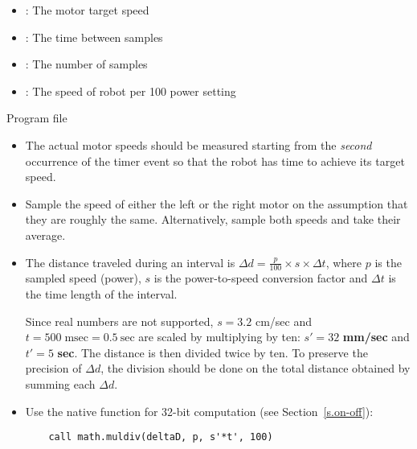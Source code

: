 
\begin{itemize}
\item {}: The motor target speed
\item {}: The time between samples
\item {}: The number of samples
\item {}: The speed of robot per 100 power setting
\end{itemize}


{\raggedleft \hfill Program file }

\begin{itemize}

\item The actual motor speeds should be measured starting from the \emph{second}
occurrence of the timer event so that the robot has time to achieve its target speed.

\item Sample the speed of either the left or the right motor on the assumption
that they are roughly the same. Alternatively, sample both speeds
and take their average.

\item The distance traveled during an interval is
$\Delta d=\frac{p}{100} \times s \times \Delta t$,
where $p$ is the sampled speed (power),
$s$ is the power-to-speed conversion factor and
$\Delta t$ is the time length of the interval.

Since real numbers are not supported,
$s=3.2$ cm/sec and $t=500 \; \textrm{msec} =0.5 \: \textrm{sec}$ are scaled
by multiplying by ten: $s'=32$ \textbf{mm/sec} and $t'=5$ \textbf{sec}.
The distance is then divided twice by ten.
To preserve the precision of $\Delta d$,
the division should be done on the total distance
obtained by summing each $\Delta d$.

\item Use the native function for 32-bit computation (see Section~\ref{s.on-off}):
\begin{verbatim}
    call math.muldiv(deltaD, p, s'*t', 100)
\end{verbatim}

\end{itemize}


